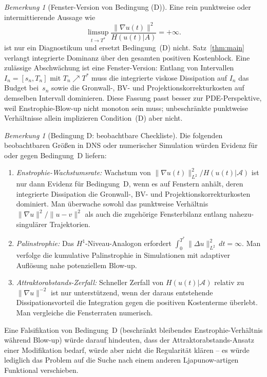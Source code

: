 \documentclass[12pt,a4paper]{article}
\theoremstyle{definition}
\theoremstyle{plain}
\theoremstyle{remark}
\newtheorem{remark}[definition]{Bemerkung}
\begin{document}
\begin{remark}[Fenster-Version von Bedingung (D)]
\label{rem:condition-d-limsup}
Eine rein punktweise oder intermittierende Aussage wie
\[
\limsup_{t \to T^*} \frac{\|\nabla u(t)\|^2}{H(u(t)|A)} = +\infty.
\]
ist nur ein Diagnostikum und ersetzt Bedingung~(D) nicht. Satz~\ref{thm:main}
verlangt integrierte Dominanz über den gesamten positiven Kostenblock. Eine
zulässige Abschwächung ist eine Fenster-Version: Entlang von Intervallen
$I_n=[s_n,T_n]$ mit $T_n\nearrow T^*$ muss die integrierte viskose Dissipation
auf $I_n$ das Budget bei~$s_n$ sowie die Gronwall-, BV- und
Projektionskorrekturkosten auf demselben Intervall dominieren. Diese Fassung
passt besser zur PDE-Perspektive, weil Enstrophie-Blow-up nicht monoton sein
muss; unbeschränkte punktweise Verhältnisse allein implizieren Condition~(D)
aber nicht.
\end{remark}

\begin{remark}[Bedingung D: beobachtbare Checkliste]
\label{rem:condition-d-checklist}
Die folgenden beobachtbaren Größen in DNS oder numerischer Simulation würden Evidenz für oder gegen Bedingung~D liefern:
\begin{enumerate}
\item \emph{Enstrophie-Wachstumsrate:} Wachstum von $\|\nabla u(t)\|_{L^2}^2 / H(u(t)|\mathcal{A})$ ist nur dann Evidenz für Bedingung~D, wenn es auf Fenstern anhält, deren integrierte Dissipation die Gronwall-, BV- und Projektionskorrekturkosten dominiert. Man überwache sowohl das punktweise Verhältnis $\|\nabla u\|^2 / \|u - v\|^2$ als auch die zugehörige Fensterbilanz entlang nahezu-singulärer Trajektorien.
\item \emph{Palinstrophie:} Das $H^1$-Niveau-Analogon erfordert $\int_0^{T^*} \|\Delta u\|_{L^2}^2\,dt = \infty$. Man verfolge die kumulative Palinstrophie in Simulationen mit adaptiver Auflösung nahe potenziellem Blow-up.
\item \emph{Attraktorabstands-Zerfall:} Schneller Zerfall von $H(u(t)|\mathcal{A})$ relativ zu $\|\nabla u\|^{-2}$ ist nur unterstützend, wenn der daraus entstehende Dissipationsvorteil die Integration gegen die positiven Kostenterme überlebt. Man vergleiche die Fensterraten numerisch.
\end{enumerate}
Eine Falsifikation von Bedingung~D (beschränkt bleibendes Enstrophie-Verhältnis während Blow-up) würde darauf hindeuten, dass der Attraktorabstands-Ansatz einer Modifikation bedarf, würde aber nicht die Regularität klären -- es würde lediglich das Problem auf die Suche nach einem anderen Ljapunow-artigen Funktional verschieben.
\end{remark}
\end{document}

